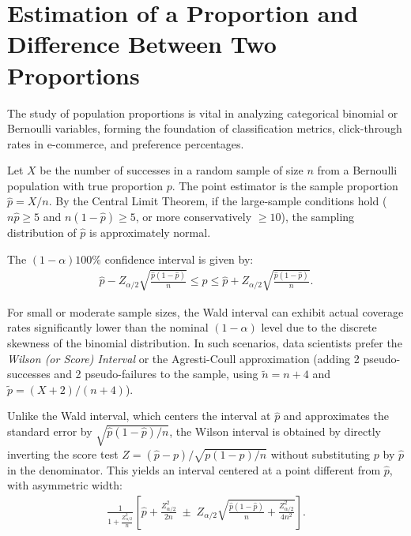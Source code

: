 \section{Estimation of a Proportion and Difference Between Two Proportions}

The study of population proportions is vital in analyzing categorical binomial or Bernoulli variables, forming the foundation of classification metrics, click-through rates in e-commerce, and preference percentages.

\begin{teorema}
	Let $X$ be the number of successes in a random sample of size $n$ from a Bernoulli population with true proportion $p$. The point estimator is the sample proportion $\hat{p} = X/n$. By the Central Limit Theorem, if the large-sample conditions hold ($n\hat{p} \geq 5$ and $n(1-\hat{p}) \geq 5$, or more conservatively $\geq 10$), the sampling distribution of $\hat{p}$ is approximately normal.
	
	The $(1-\alpha)100\%$ confidence interval is given by:
	\begin{align}
		\hat{p} - Z_{\alpha/2} \sqrt{\frac{\hat{p}(1-\hat{p})}{n}} \leq p \leq \hat{p} + Z_{\alpha/2} \sqrt{\frac{\hat{p}(1-\hat{p})}{n}}.
	\end{align}
\end{teorema}

\begin{observacion}
	For small or moderate sample sizes, the Wald interval can exhibit actual coverage rates significantly lower than the nominal $(1-\alpha)$ level due to the discrete skewness of the binomial distribution. In such scenarios, data scientists prefer the \emph{Wilson (or Score) Interval} or the Agresti-Coull approximation (adding 2 pseudo-successes and 2 pseudo-failures to the sample, using $\tilde{n} = n + 4$ and $\tilde{p} = (X+2)/(n+4)$).
\end{observacion}

\begin{teorema}
	Unlike the Wald interval, which centers the interval at $\hat{p}$ and approximates the standard error by $\sqrt{\hat p(1-\hat p)/n}$, the Wilson interval is obtained by directly inverting the score test $Z = (\hat{p}-p)/\sqrt{p(1-p)/n}$ without substituting $p$ by $\hat{p}$ in the denominator. This yields an interval centered at a point different from $\hat p$, with asymmetric width:
	\begin{align}
		\frac{1}{1+\frac{Z_{\alpha/2}^2}{n}}\left[\hat{p} + \frac{Z_{\alpha/2}^2}{2n} \;\pm\; Z_{\alpha/2}\sqrt{\frac{\hat{p}(1-\hat{p})}{n} + \frac{Z_{\alpha/2}^2}{4n^2}}\right].
	\end{align}
\end{teorema}

